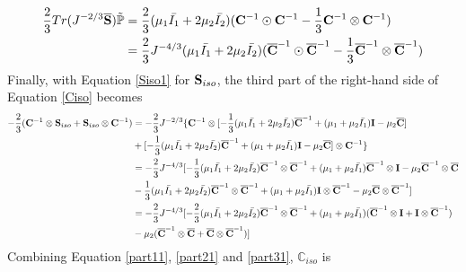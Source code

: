 \begin{equation} \label{part21}
\begin{split}
\frac{2}{3}Tr(J^{-2/3}\overline{\bold{S}})\tilde{\mathbb{P}} &= \frac{2}{3}(\mu_1\bar{I_1} + 2\mu_2\bar{I_2})({\bold{C}}^{-1} \odot {\bold{C}}^{-1} - \frac{1}{3}{\bold{C}}^{-1} \otimes {\bold{C}}^{-1}) \\
&= \frac{2}{3}J^{-4/3}(\mu_1\bar{I_1} + 2\mu_2\bar{I_2})({\overline{\bold{C}}}^{-1} \odot {{\overline{\bold{C}}}}^{-1} - \frac{1}{3}{{\overline{\bold{C}}}}^{-1} \otimes {\overline{{\bold{C}}}}^{-1})
\end{split}
\end{equation}
Finally, with Equation \ref{Siso1} for $\bold{S}_{iso}$, the third part of the right-hand side of Equation \ref{Ciso} becomes
\begin{equation} \label{part31}
\begin{split}
- \frac{2}{3}(\bold{C}^{-1}\otimes\bold{S}_{iso} + \bold{S}_{iso}\otimes \bold{C}^{-1})
&=
- \frac{2}{3}J^{-2/3} \{ {\bold{C}}^{-1} \otimes [-\frac{1}{3}(\mu_1\bar{I_1} + 2\mu_2\bar{I_2}){\overline{\bold{C}}}^{-1} + (\mu_1 + \mu_2\bar{I_1})\bold{I} - \mu_2{\overline{\bold{C}}}] \\
&+
[-\frac{1}{3}(\mu_1\bar{I_1} + 2\mu_2\bar{I_2}){\overline{\bold{C}}}^{-1} + (\mu_1 + \mu_2\bar{I_1})\bold{I} - \mu_2{\overline{\bold{C}}}] \otimes {\bold{C}}^{-1}\} \\
&=
- \frac{2}{3}J^{-4/3} [ -\frac{1}{3}(\mu_1\bar{I_1} + 2\mu_2\bar{I_2}) {\overline{\bold{C}}}^{-1} \otimes {\overline{\bold{C}}}^{-1} + (\mu_1 + \mu_2\bar{I_1}){\overline{\bold{C}}}^{-1}\otimes\bold{I} - \mu_2{\overline{\bold{C}}}^{-1} \otimes {\overline{\bold{C}}} \\
&-
\frac{1}{3}(\mu_1\bar{I_1} + 2\mu_2\bar{I_2}) {\overline{\bold{C}}}^{-1} \otimes {\overline{\bold{C}}}^{-1} + (\mu_1 + \mu_2\bar{I_1})\bold{I} \otimes {\overline{\bold{C}}}^{-1} - \mu_2{\overline{\bold{C}}} \otimes {\overline{\bold{C}}}^{-1}] \\
&=
 - \frac{2}{3}J^{-4/3} [ -\frac{2}{3}(\mu_1\bar{I_1} + 2\mu_2\bar{I_2}){\overline{\bold{C}}}^{-1} \otimes {\overline{\bold{C}}}^{-1} + (\mu_1+\mu_2\bar{I_1})({\overline{\bold{C}}}^{-1} \otimes \bold{I} + \bold{I} \otimes {\overline{\bold{C}}}^{-1})\\
&- \mu_2({\overline{\bold{C}}}^{-1} \otimes {\overline{\bold{C}}}+{\overline{\bold{C}}} \otimes {\overline{\bold{C}}}^{-1}) ]
\end{split}
\end{equation}
Combining Equation \ref{part11}, \ref{part21} and \ref{part31}, $\mathbb{C}_{iso}$ is
